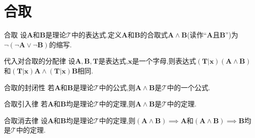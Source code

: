 \section{合取}

\begin{definition}{合取}{}
	设$\boldsymbol{A}$和$\boldsymbol{B}$是理论$\mathcal{T}$中的表达式.定义$\boldsymbol{A}$和$\boldsymbol{B}$的合取式$\boldsymbol{A}\wedge\boldsymbol{B}$(读作``$\boldsymbol{A}$且$\boldsymbol{B}$'')为$\neg\left(\neg\boldsymbol{A}\vee\neg\boldsymbol{B}\right)$的缩写.
\end{definition}

\begin{metatheorem}{代入对合取的分配律}{}
	设$\boldsymbol{A},\boldsymbol{B},\boldsymbol{T}$是表达式,$\boldsymbol{x}$是一个字母,则表达式$\left(\boldsymbol{T}|\boldsymbol{x}\right)\left(\boldsymbol{A}\wedge\boldsymbol{B}\right)$和$\left(\boldsymbol{T}|\boldsymbol{x}\right)\boldsymbol{A}\wedge\left(\boldsymbol{T}|\boldsymbol{x}\right)\boldsymbol{B}$相同.
\end{metatheorem}

\begin{metatheorem}{合取的封闭性}{}
	若$\boldsymbol{A}$和$\boldsymbol{B}$是理论$\mathcal{T}$中的公式,则$\boldsymbol{A}\wedge\boldsymbol{B}$是$\mathcal{T}$中的一个公式.
\end{metatheorem}

\begin{metatheorem}{合取引入律}{}
	若$\boldsymbol{A}$和$\boldsymbol{B}$均是理论$\mathcal{T}$中的定理,则$\boldsymbol{A}\wedge\boldsymbol{B}$是$\mathcal{T}$中的定理.
\end{metatheorem}

\begin{metatheorem}{合取消去律}{}
	设$\boldsymbol{A}$和$\boldsymbol{B}$均是理论$\mathcal{T}$中的定理,则$\left(\boldsymbol{A}\wedge\boldsymbol{B}\right)\implies\boldsymbol{A}$和$\left(\boldsymbol{A}\wedge\boldsymbol{B}\right)\implies\boldsymbol{B}$均是$\mathcal{T}$中的定理.
\end{metatheorem}

